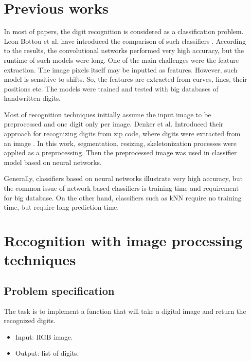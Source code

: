 \documentclass[conference]{IEEEtran}
\begin{document}
\section{Previous works} 

In most of papers, the digit recognition is considered as a classification problem. Leon Bottou et al. have introduced the comparison of such classifiers \cite{bottou}. According to the results, the convolutional networks performed very high accuracy, but the runtime of such models were long. One of the main challenges were the feature extraction. The image pixels itself may be inputted as features. However, such model is sensitive to shifts. So, the features are extracted from curves, lines, their positions etc. The models were trained and tested with big databases of handwritten digits. 

Most of recognition techniques initially assume the input image to be preprocessed and one digit only per image. Denker et al. Introduced their approach for recognizing digits from zip code, where digits were extracted from an image \cite{denker}. In this work, segmentation, resizing, skeletonization processes were applied as a preprocessing. Then the preprocessed image was used in classifier model based on neural networks.  

Generally, classifiers based on neural networks illustrate very high accuracy, but the common issue of network-based classifiers is training time and requirement for big database. On the other hand, classifiers such as kNN require no training time, but require long prediction time. 

\section{Recognition with image processing techniques} 

\subsection{Problem specification} 

The task is to implement a function that will take a digital image and return the recognized digits. 
\begin{itemize}
\item Input: RGB image. 
\item Output: list of digits. 
\end{itemize} 
\end{document}
